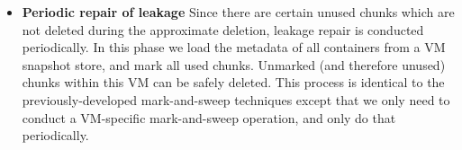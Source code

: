 \begin{itemize}
\item {\bf Periodic repair of leakage}
Since there are certain unused chunks which are not deleted during
the approximate deletion, leakage repair is conducted periodically.
In this phase we load the metadata of all containers from a VM snapshot store,
and mark all used chunks. Unmarked (and therefore unused) chunks within this VM can be safely deleted.
This process is identical to the previously-developed mark-and-sweep techniques except that
we only need to conduct a VM-specific mark-and-sweep  operation, and only do that periodically.
\end{itemize}





%



